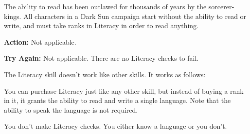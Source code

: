 
The ability to read has been outlawed for thousands of years by the sorcerer‐kings. All characters in a {\tableheader Dark Sun} campaign start without the ability to read or write, and must take ranks in Literacy in order to read anything.

\textbf{Action:} Not applicable.

\textbf{Try Again:} Not applicable. There are no Literacy checks to fail.

The Literacy skill doesn't work like other skills. It works as follows:

\begin{itemize*}
\item You can purchase Literacy just like any other skill, but instead of buying a rank in it, it grants the ability to read and write a single language. Note that the ability to speak the language is not required.
\item You don't make Literacy checks. You either know a language or you don't.
\end{itemize*}

